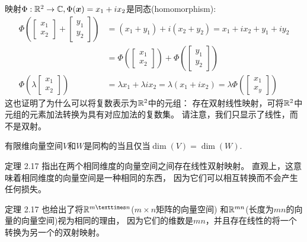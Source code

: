 \begin{example}[同态]
    映射$\Phi:\mathbb{R}^2 \rightarrow \mathbb{C}, \Phi(\boldsymbol{x}) = x_1 + ix_2$是同态(homomorphism):
    \begin{equation}
        \begin{aligned}
            \Phi\left(
                \begin{bmatrix} x_1 \\ x_2 \end{bmatrix} +
                \begin{bmatrix} y_1 \\ y_2 \end{bmatrix}
                \right) &=
            (x_1 + y_1) + i(x_2 + y_2) = x_1 + ix_2 + y_1 + iy_2 \\
            &= \Phi \left(\begin{bmatrix} x_1 \\ x_2 \end{bmatrix}\right)
            + \Phi \left(\begin{bmatrix} y_1 \\ y_2 \end{bmatrix}\right) \\
            \Phi\left(\lambda \begin{bmatrix} x_1 \\ x_2 \end{bmatrix}\right)
            &= \lambda x_1 + \lambda i x_2 = \lambda(x_1+ix_2)
            = \lambda \Phi\left(\begin{bmatrix} x_1 \\ x_y \end{bmatrix}\right)
        \end{aligned}
    \end{equation}
    这也证明了为什么可以将复数表示为$\mathbb{R}^2$中的元组：
    存在双射线性映射，可将$\mathbb{R}^2$中元组的元素加法转换为具有对应加法的复数集。
    请注意，我们只显示了线性，而不是双射。
\end{example}

\begin{theorem}
    有限维向量空间$V$和$W$是同构的当且仅当$\dim(V) = \dim(W)$.
\end{theorem}

定理 2.17 指出在两个相同维度的向量空间之间存在线性双射映射。
直观上，这意味着相同维度的向量空间是一种相同的东西，
因为它们可以相互转换而不会产生任何损失。

定理 2.17 也给出了将$\R^{m×n}$($m\times n$矩阵的向量空间)
和$\mathbb{R}^{mn}$(长度为$mn$的向量的向量空间)视为相同的理由，
因为它们的维数是$mn$，并且存在线性的将一个转换为另一个的双射映射。

